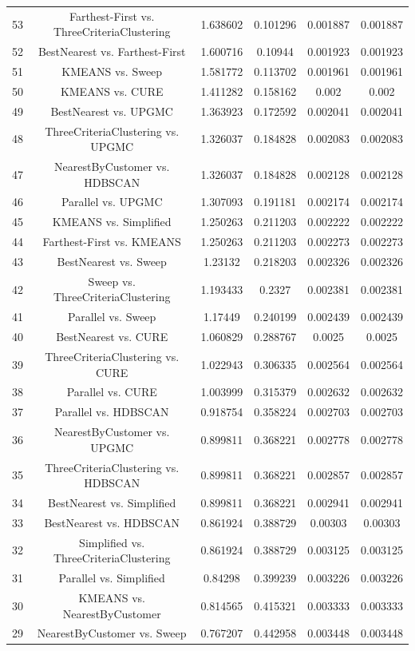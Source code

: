 \documentclass[a4paper,10pt]{article}
\begin{document}
\begin{landscape}
\begin{table}[!htp]
\begin{tabular}{cccccc}
53&Farthest-First vs. ThreeCriteriaClustering&1.638602&0.101296&0.001887&0.001887\\
52&BestNearest vs. Farthest-First&1.600716&0.10944&0.001923&0.001923\\
51&KMEANS vs. Sweep&1.581772&0.113702&0.001961&0.001961\\
50&KMEANS vs. CURE&1.411282&0.158162&0.002&0.002\\
49&BestNearest vs. UPGMC&1.363923&0.172592&0.002041&0.002041\\
48&ThreeCriteriaClustering vs. UPGMC&1.326037&0.184828&0.002083&0.002083\\
47&NearestByCustomer vs. HDBSCAN&1.326037&0.184828&0.002128&0.002128\\
46&Parallel vs. UPGMC&1.307093&0.191181&0.002174&0.002174\\
45&KMEANS vs. Simplified&1.250263&0.211203&0.002222&0.002222\\
44&Farthest-First vs. KMEANS&1.250263&0.211203&0.002273&0.002273\\
43&BestNearest vs. Sweep&1.23132&0.218203&0.002326&0.002326\\
42&Sweep vs. ThreeCriteriaClustering&1.193433&0.2327&0.002381&0.002381\\
41&Parallel vs. Sweep&1.17449&0.240199&0.002439&0.002439\\
40&BestNearest vs. CURE&1.060829&0.288767&0.0025&0.0025\\
39&ThreeCriteriaClustering vs. CURE&1.022943&0.306335&0.002564&0.002564\\
38&Parallel vs. CURE&1.003999&0.315379&0.002632&0.002632\\
37&Parallel vs. HDBSCAN&0.918754&0.358224&0.002703&0.002703\\
36&NearestByCustomer vs. UPGMC&0.899811&0.368221&0.002778&0.002778\\
35&ThreeCriteriaClustering vs. HDBSCAN&0.899811&0.368221&0.002857&0.002857\\
34&BestNearest vs. Simplified&0.899811&0.368221&0.002941&0.002941\\
33&BestNearest vs. HDBSCAN&0.861924&0.388729&0.00303&0.00303\\
32&Simplified vs. ThreeCriteriaClustering&0.861924&0.388729&0.003125&0.003125\\
31&Parallel vs. Simplified&0.84298&0.399239&0.003226&0.003226\\
30&KMEANS vs. NearestByCustomer&0.814565&0.415321&0.003333&0.003333\\
29&NearestByCustomer vs. Sweep&0.767207&0.442958&0.003448&0.003448\\

\end{tabular}
\end{table}
\end{landscape}
\end{document}

